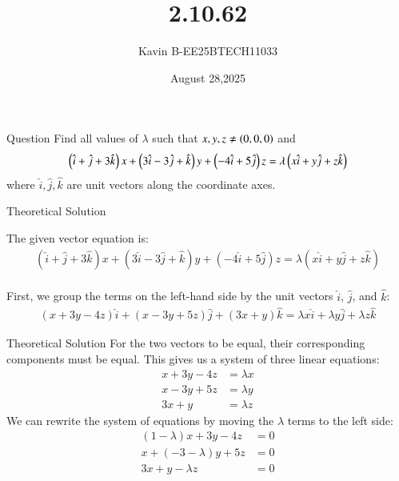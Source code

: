 \documentclass{beamer}
\begin{document}
\title 
{2.10.62}
\date{August 28,2025}


\author 
{Kavin B-EE25BTECH11033}






\frame{\titlepage}
\begin{frame}{Question}
Find all values of $\lambda$ such that $x,y,z\neq\left(0,0,0\right)$ and $$\left(\hat{i}+\hat{j}+3\hat{k}\right)x+\left(3\hat{i}-3\hat{j}+\hat{k}\right)y+\left(-4\hat{i}+5\hat{j}\right)z=\lambda\left(x\hat{i}+y\hat{j}+z\hat{k}\right)$$ where $\hat{i}, \hat{j}, \hat{k}$ are unit vectors along the coordinate axes.
\end{frame}



\begin{frame}{Theoretical Solution}

The given vector equation is:
\begin{align}
(\hat{i} + \hat{j} + 3\hat{k})x + (3\hat{i} - 3\hat{j} + \hat{k})y + (-4\hat{i} + 5\hat{j})z = \lambda(x\hat{i} + y\hat{j} + z\hat{k})
\end{align}\\

First, we group the terms on the left-hand side by the unit vectors $\hat{i}$, $\hat{j}$, and $\hat{k}$:
\begin{align}
    (x + 3y - 4z)\hat{i} + (x - 3y + 5z)\hat{j} + (3x + y)\hat{k} = \lambda x\hat{i} + \lambda y\hat{j} + \lambda z\hat{k}
\end{align}

\end{frame}

\begin{frame}{Theoretical Solution}
For the two vectors to be equal, their corresponding components must be equal. This gives us a system of three linear equations:
\begin{align}
    x + 3y - 4z &= \lambda x \\
    x - 3y + 5z &= \lambda y \\
    3x + y &= \lambda z
\end{align}
We can rewrite the system of equations by moving the $\lambda$ terms to the left side:
\begin{align}
    (1 - \lambda)x + 3y - 4z &= 0 \\
    x + (-3 - \lambda)y + 5z &= 0 \\
    3x + y - \lambda z &= 0
\end{align}

\end{frame}
\end{document}
